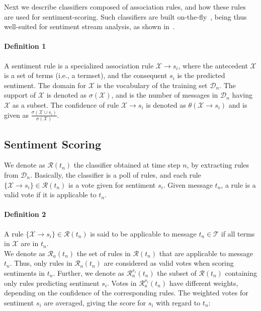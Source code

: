 Next we describe classifiers composed of association rules, and how these rules are used for sentiment-scoring. Such classifiers are built on-the-fly~\cite{hipc,lac}, being thus well-suited for sentiment stream analysis, as shown in~\cite{sigir}.

\paragraph*{\bf{Definition 1}}
A sentiment rule is a specialized association rule $\mathcal{X}\xrightarrow{}s_i$, where the antecedent $\mathcal{X}$ is a set of terms (i.e., a termset), and the consequent $s_i$ is the predicted sentiment. The domain for $\mathcal{X}$ is the vocabulary of the training set $\mathcal{D}_n$.
The support of $\mathcal{X}$ is denoted as $\sigma(\mathcal{X})$, and is the number of messages in $\mathcal{D}_n$ having $\mathcal{X}$ as a subset. The confidence of rule $\mathcal{X}\xrightarrow{}s_i$ is denoted as $\theta(\mathcal{X}\xrightarrow{}s_i)$ and is given as $\displaystyle\frac{\sigma(\mathcal{X}\cup s_i)}{\sigma(\mathcal{X})}$.\\

\subsection*{Sentiment Scoring}

We denote as $\mathcal{R}(t_n)$ the classifier obtained at time step $n$, by extracting rules from $\mathcal{D}_n$.
Basically, the classifier is a poll of rules, and each rule $\{\mathcal{X}\xrightarrow{}s_i\}\in\mathcal{R}(t_n)$ is a vote given for sentiment $s_i$. Given message $t_n$, a rule is a valid vote if it is applicable to $t_n$.

\paragraph*{\bf{Definition 2}} A rule $\{\mathcal{X}\xrightarrow{}s_i\}\in\mathcal{R}(t_n)$ is said to be applicable to message $t_n\in\mathcal{T}$ if
all terms in $\mathcal{X}$ are in $t_n$.\\

We denote as $\mathcal{R}_a(t_n)$ the set of rules in $\mathcal{R}(t_n)$ that are applicable to message $t_n$. Thus, only rules in $\mathcal{R}_a(t_n)$ are considered as valid votes when scoring sentiments in $t_n$.
Further, we denote as $\mathcal{R}^{s_i}_a(t_n)$ the subset of $\mathcal{R}(t_n)$ containing only rules predicting sentiment $s_i$.
Votes in $\mathcal{R}^{s_i}_a(t_n)$ have different weights, depending on the confidence of the corresponding rules. The weighted votes for sentiment $s_i$ are averaged, giving the score for $s_i$ with regard to $t_n$:

